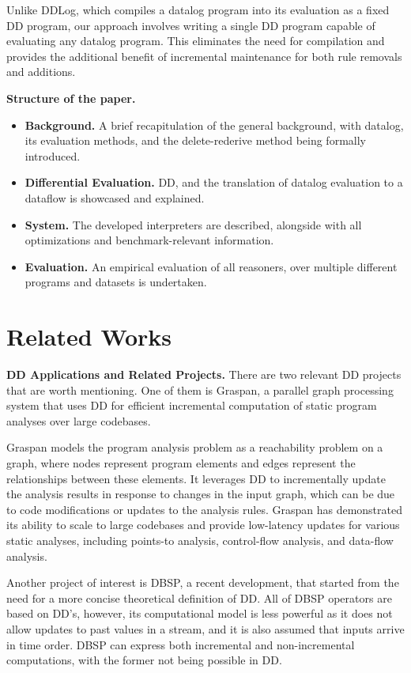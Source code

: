 \documentclass[sigconf,screen,review=false,natbib]{acmart}
\theoremstyle{definition}
\begin{document}
Unlike DDLog, which compiles a datalog program into its evaluation as a fixed DD program, our
approach involves writing a single DD program capable of evaluating any datalog program. This
eliminates the need for compilation and provides the additional benefit of incremental maintenance for both rule
removals and additions.

\textbf{Structure of the paper.}
\begin{itemize}
	\item{\textbf{Background.}} A brief recapitulation of the general background, with datalog, its evaluation
	methods, and the delete-rederive method being formally introduced.
	\item{\textbf{Differential Evaluation.}} DD, and the translation of datalog evaluation to
	a dataflow is showcased and explained.
	\item{\textbf{System.}} The developed interpreters are described, alongside with all optimizations and
	benchmark-relevant information.
	\item{\textbf{Evaluation.}} An empirical evaluation of all reasoners, over multiple different programs and
	datasets is undertaken.
\end{itemize}
\section{Related Works}
\textbf{DD Applications and Related Projects.} There are two relevant DD projects that are worth
mentioning. One of them is Graspan, a parallel graph processing system that uses DD for efficient
incremental computation of static program analyses over large codebases.

Graspan models the program analysis problem as a reachability problem on a graph, where nodes represent program elements
and edges represent the relationships between these elements. It leverages DD to incrementally update
the analysis results in response to changes in the input graph, which can be due to code modifications or updates to
the analysis rules. Graspan has demonstrated its ability to scale to large codebases and provide low-latency updates
for various static analyses, including points-to analysis, control-flow analysis, and data-flow analysis.

Another project of interest is DBSP\cite{dbsp}, a recent development, that started from the need for a more concise
theoretical definition of DD. All of DBSP operators are based on DD's, however, its
computational model is less powerful as it does not allow updates to past values in a stream, and it is also assumed that
inputs arrive in time order. DBSP can express both incremental and non-incremental computations, with the former not being
possible in DD.
\end{document}
